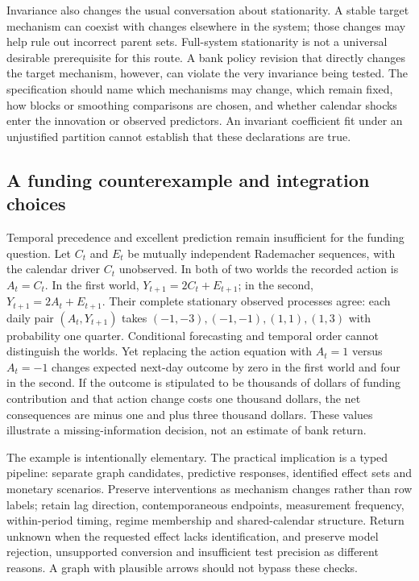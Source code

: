 Invariance also changes the usual conversation about stationarity. A stable
target mechanism can coexist with changes elsewhere in the system; those changes
may help rule out incorrect parent sets. Full-system stationarity is not a
universal desirable prerequisite for this route. A bank policy revision that
directly changes the target mechanism, however, can violate the very invariance
being tested. The specification should name which mechanisms may change, which
remain fixed, how blocks or smoothing comparisons are chosen, and whether
calendar shocks enter the innovation or observed predictors. An invariant
coefficient fit under an unjustified partition cannot establish that these
declarations are true. \citep{exec14_rtime_pfister}

\subsection{A funding counterexample and integration choices}

Temporal precedence and excellent prediction remain insufficient for the funding
question. Let \(C_t\) and \(E_t\) be mutually independent Rademacher sequences,
with the calendar driver \(C_t\) unobserved. In both of two worlds the recorded
action is \(A_t=C_t\). In the first world,
\(Y_{t+1}=2C_t+E_{t+1}\); in the second,
\(Y_{t+1}=2A_t+E_{t+1}\). Their complete stationary observed processes agree:
each daily pair \((A_t,Y_{t+1})\) takes
\((-1,-3),(-1,-1),(1,1),(1,3)\) with probability one quarter. Conditional
forecasting and temporal order cannot distinguish the worlds. Yet replacing
the action equation with \(A_t=1\) versus \(A_t=-1\) changes expected next-day
outcome by zero in the first world and four in the second. If the outcome is
stipulated to be thousands of dollars of funding contribution and that action
change costs one thousand dollars, the net consequences are minus one and plus
three thousand dollars. These values illustrate a missing-information decision,
not an estimate of bank return. \citep{exec14_rtime_exact}

The example is intentionally elementary. The practical implication is a typed
pipeline: separate graph candidates, predictive responses, identified effect
sets and monetary scenarios. Preserve interventions as mechanism changes rather
than row labels; retain lag direction, contemporaneous endpoints, measurement
frequency, within-period timing, regime membership and shared-calendar structure.
Return unknown when the requested effect lacks identification, and preserve
model rejection, unsupported conversion and insufficient test precision as
different reasons. A graph with plausible arrows should not bypass these checks.
\citep{exec14_rtime_contract}


